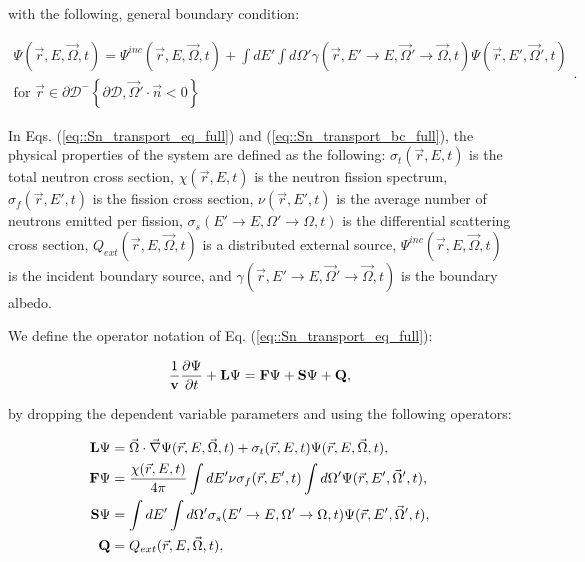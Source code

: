 \noindent with the following, general boundary condition:

\begin{equation}
\label{eq::Sn_transport_bc_full}
\begin{aligned}
	\Psi (\vec{r}, E, \vec{\Omega},t) = \Psi^{inc} (\vec{r}, E, \vec{\Omega},t) + \int dE' \int d\Omega' \gamma (\vec{r}, E' \rightarrow E, \vec{\Omega}' \rightarrow \vec{\Omega},t) \Psi (\vec{r}, E', \vec{\Omega}',t) \\
	\text{for } \vec{r} \in \partial \mathcal{D}^{-} \left\{   \partial \mathcal{D}, \vec{\Omega}' \cdot \vec{n} < 0  \right\}
\end{aligned} .
\end{equation}

\noindent In Eqs. (\ref{eq::Sn_transport_eq_full}) and (\ref{eq::Sn_transport_bc_full}), the physical properties of the system are defined as the following: $\sigma_t (\vec{r}, E,t)$ is the total neutron cross section, $\chi (\vec{r}, E,t)$ is the neutron fission spectrum, $\sigma_f (\vec{r}, E',t)$ is the fission cross section, $\nu (\vec{r}, E',t)$ is the average number of neutrons emitted per fission, $\sigma_s (E' \rightarrow E, \Omega' \rightarrow \Omega,t)$ is the differential scattering cross section, $Q_{ext} (\vec{r}, E, \vec{\Omega},t)$ is a distributed external source, $\Psi^{inc} (\vec{r}, E, \vec{\Omega},t)$ is the incident boundary source, and $\gamma (\vec{r}, E' \rightarrow E, \vec{\Omega}' \rightarrow \vec{\Omega},t)$ is the boundary albedo. 

We define the operator notation of Eq. (\ref{eq::Sn_transport_eq_full}):

\begin{equation}
\label{eq::Sn_transport_eq_op}
	\frac{1}{{\bf v}} \frac{\partial \Psi}{\partial t} + {\bf L} \Psi =  {\bf F} \Psi  + {\bf S} \Psi + {\bf Q},
\end{equation}

\noindent by dropping the dependent variable parameters and using the following operators:

\begin{equation}
\label{eq::Sn_transport_operators}
\begin{aligned}
	{\bf L} \Psi &= \vec{\Omega} \cdot \vec{\nabla} \Psi (\vec{r}, E, \vec{\Omega},t)+ \sigma_t (\vec{r}, E,t) \Psi (\vec{r}, E, \vec{\Omega},t), \\
	{\bf F} \Psi &= \frac{\chi (\vec{r}, E,t)}{4 \pi} \int dE' \nu \sigma_f (\vec{r}, E',t) \int d\Omega' \Psi (\vec{r}, E', \vec{\Omega}',t), \\
	{\bf S} \Psi &= \int dE' \int d\Omega' \sigma_s (E' \rightarrow E, \Omega' \rightarrow \Omega, t) \Psi (\vec{r}, E', \vec{\Omega}', t),  \\
	{\bf Q}       & = Q_{ext} (\vec{r}, E, \vec{\Omega},t) ,
\end{aligned}
\end{equation}

